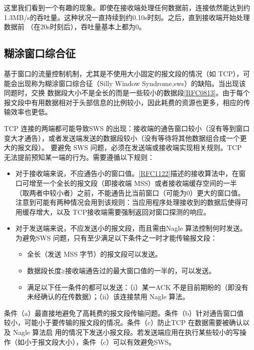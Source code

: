 这里我们看到一个有趣的现象。即使在接收端处理任何数据前，连接依然能达到约1.3MB/s的吞吐量。这种状况一直持续到约0.10s时刻。之后，直到接收端开始处理数据前
（在20s时刻后），吞吐量基本上都为0。

\subsection{糊涂窗口综合征}
基于窗口的流量控制机制，尤其是不使用大小固定的报文段的情况（如 TCP），可能会出现称为糊涂窗口综合征（Silly Window Syndrome,sws）的缺陷。当出现该同题时，交换
数据段大小不是全长的而是一些较小的数据段\href{https://www.rfc-editor.org/rfc/rfc0813}{[RFC0813]}。由于每个报文段中有用数据相对于头部信息的比例较小，因此耗费的资源也更多，相应的传输效率也更低。

TCP 连接的两端都可能导致SWS 的出现：接收端的通告窗口较小（沒有等到窗口变大才通告），或者发送端发送的数据段较小（没有等待将其他数据组合成一个更大的报文段）。
要避免 SWS 问题，必须在发送端或接收端实现相关规则。TCP 无法提前预知某一端的行为。需要遵循以下规则：
\begin{itemize}
    \item 对于接收端来说，不应通告小的窗口值。\href{https://www.rfc-editor.org/rfc/rfc1122}{[RFC1122]}描述的接收算法中，在窗口可增至一个全长的报文段（即接收端 MSS）或者接收端缓存空间的一半（取两者中较小者）之前，不能通告比当前窗口（可能为0）更大的窗口值。注意到可能有两种情况会用到该规则：当应用程序处理接收到的数据后使得可用缓存增大，以及 TCP接收端需要强制返回对窗口探测的响应。
    \item 对于发送端来说，不应发送小的报文段，而且需由Nagle 算法控制何时发送。为避免SWS 问题，只有至少满足以下条件之一时才能传输报文段：
    \begin{itemize}
        \item 全长（发送 MSS 字节）的报文段可以发送。
        \item 数据段长度≥接收端通告过的最大窗口值的一半的，可以发送。
        \item 满足以下任一条件的都可以发送：（i）某一ACK 不是目前期盼的（即没有未经确认的在传数据）；（ii）该连接禁用 Nagle 算法。
    \end{itemize}
\end{itemize}

条件（a）最直接地避免了高耗费的报文段传输问题。条件（b）针对通告窗口值较小，可能小于要传输的报文段的情况。条件（c）防止TCP 在数据需要被确认以及 Nagle 算法启
用的情况下发送小报文段。若发送端应用在执行某些较小的写操作（如小于报文段大小），条件（c）可以有效避免SWS。

